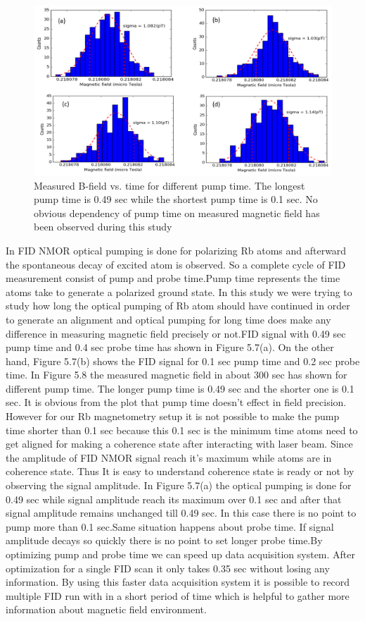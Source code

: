    \begin{figure}[h]
\centering\includegraphics[width=0.75\linewidth]{figures/pump_time}
\caption{Measured B-field vs. time   for different pump time. The longest pump time is 0.49 sec while the shortest pump time is 0.1 sec. No obvious dependency of pump time on  measured magnetic field has been observed during this study}
\end{figure}
In FID NMOR optical pumping is done for polarizing Rb atoms and afterward the spontaneous decay of excited atom is observed. So a complete cycle of FID measurement consist of pump and probe time.Pump time represents the time atoms take to generate a polarized ground state. In this study we were trying to study how long the optical pumping of Rb atom should have continued in order to generate an alignment and optical pumping for long time does make any difference in measuring magnetic field precisely or not.FID signal with 0.49 sec pump time and 0.4 sec probe time has shown in Figure 5.7(a). On the other hand, Figure 5.7(b) shows  the FID signal for 0.1 sec pump time and 0.2 sec probe time. In Figure 5.8 the measured magnetic field in about 300 sec has shown for different pump time. The longer pump time is 0.49 sec and the shorter one is 0.1 sec. It is obvious from the plot that pump time doesn't effect in field precision. However for our Rb magnetometry setup it is not possible to make the pump time shorter than 0.1 sec because this 0.1 sec is the minimum time atoms need to get aligned for making a coherence state after interacting with laser beam. Since the amplitude of FID NMOR signal reach it's maximum while atoms are in coherence state. Thus It is easy to understand coherence state is ready or not by observing the signal amplitude. In Figure 5.7(a) the optical pumping is done for 0.49 sec while signal amplitude reach its maximum over 0.1 sec and after that signal amplitude remains unchanged till 0.49 sec. In this case there is no point to pump more than 0.1 sec.Same situation happens about probe time. If signal amplitude decays so quickly there is no point to set longer probe time.By optimizing pump and probe time we can speed up data acquisition system. After optimization for a single FID scan it only takes 0.35 sec without losing any information. By using this faster data acquisition system it is possible to record multiple FID run with in a short period of time which is helpful to gather more information about magnetic field environment.
\newpage
